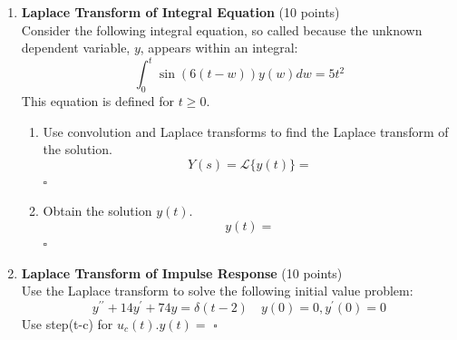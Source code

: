 \begin{enumerate}
  Use the form above to write the solution to the differential equation
  $$
  \begin{aligned}
  & \quad y^{\prime \prime}-7 y^{\prime}+10 y=9 t^2 e^{2 t} \quad \text { with } \quad y(0)=-3, \quad y^{\prime}(0)=-9 \\
  & y=\square+(\square * \square)
  \end{aligned}
  $$
  \begin{subanswer}
  \end{subanswer}

  \item \textbf{Laplace Transform of Integral Equation} (10 points)\\
  Consider the following integral equation, so called because the unknown dependent variable, $y$, appears within an integral:
  $$
  \int_0^t \sin (6(t-w)) y(w) d w=5 t^2
  $$
  This equation is defined for $t \geq 0$.
  \begin{enumerate}[label=\alph*]
    \item Use convolution and Laplace transforms to find the Laplace transform of the solution.
    $$
    Y(s)=\mathcal{L}\{y(t)\}=
    $$
    $\square$
    \begin{subanswer}
    \end{subanswer}
    \item Obtain the solution $y(t)$.
    $$
    y(t)=
    $$
    $\square$
    \begin{subanswer}
    \end{subanswer}
  \end{enumerate}

  \item \textbf{Laplace Transform of Impulse Response} (10 points)\\
  Use the Laplace transform to solve the following initial value problem:
  $$
  y^{\prime \prime}+14 y^{\prime}+74 y=\delta(t-2) \quad y(0)=0, y^{\prime}(0)=0
  $$
  Use step(t-c) for $u_c(t) . y(t)=$ $\square$
  \begin{subanswer}
  \end{subanswer}


\end{enumerate}
